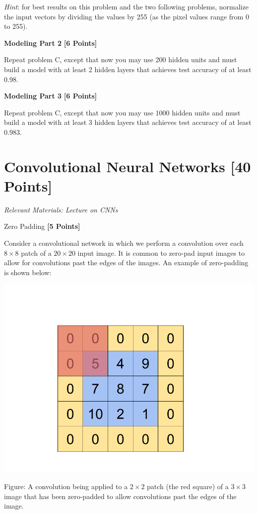 \textit{Hint}: for best results on this problem and the two following problems, normalize the input vectors by dividing the values by 255 (as the pixel values range from 0 to 255).

\begin{solution}

\end{solution}


 \problem \textbf{Modeling Part 2} \textbf{[6 Points]}

 Repeat problem C, except that now you may use 200 hidden units and must build a model with at least 2 hidden layers that achieves test accuracy of at least 0.98.

 \begin{solution}

\end{solution}

  \problem \textbf{Modeling Part 3} \textbf{[6 Points]}

 Repeat problem C, except that now you may use 1000 hidden units and must build a model with at least 3 hidden layers that achieves test accuracy of at least 0.983.

  \begin{solution}

\end{solution}



 \newpage
 \section{Convolutional Neural Networks  [40 Points]}
 \textit{Relevant Materials: Lecture on CNNs}

 \problem Zero Padding \textbf{[5 Points]}

 Consider a convolutional network in which we perform a convolution over each $8 \times 8$ patch of a $20 \times 20$ input image. It is common to zero-pad input images to allow for convolutions past the edges of the images. An example of zero-padding is shown below:

\begin{center}
  \includegraphics[width=.49\textwidth]{Plots/ConvolutionExample.png}
\end{center}
\begin{small}
Figure: A convolution being applied to a $2 \times 2$ patch (the red square) of a $3 \times 3$ image that has been zero-padded to allow convolutions past the edges of the image.
\end{small}

